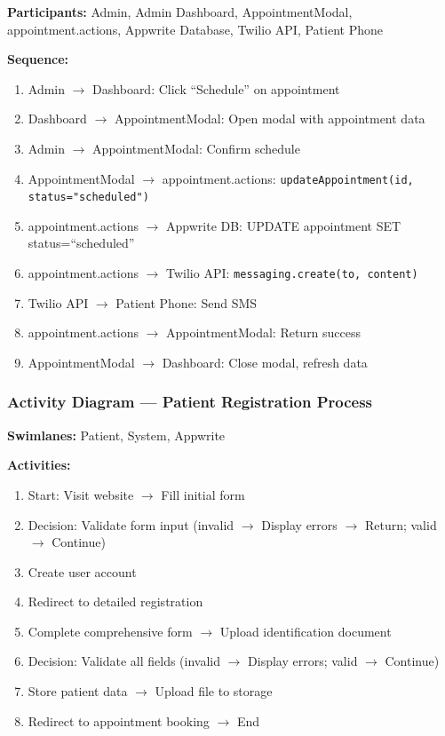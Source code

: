 \documentclass[11pt,a4paper]{article}
\begin{document}
\textbf{Participants:} Admin, Admin Dashboard, AppointmentModal, appointment.actions, Appwrite Database, Twilio API, Patient Phone

\textbf{Sequence:}
\begin{enumerate}
    \item Admin $\rightarrow$ Dashboard: Click ``Schedule'' on appointment
    \item Dashboard $\rightarrow$ AppointmentModal: Open modal with appointment data
    \item Admin $\rightarrow$ AppointmentModal: Confirm schedule
    \item AppointmentModal $\rightarrow$ appointment.actions: \texttt{updateAppointment(id, status="scheduled")}
    \item appointment.actions $\rightarrow$ Appwrite DB: UPDATE appointment SET status=``scheduled''
    \item appointment.actions $\rightarrow$ Twilio API: \texttt{messaging.create(to, content)}
    \item Twilio API $\rightarrow$ Patient Phone: Send SMS
    \item appointment.actions $\rightarrow$ AppointmentModal: Return success
    \item AppointmentModal $\rightarrow$ Dashboard: Close modal, refresh data
\end{enumerate}

\subsubsection{Activity Diagram --- Patient Registration Process}

\textbf{Swimlanes:} Patient, System, Appwrite

\textbf{Activities:}
\begin{enumerate}
    \item [Patient] Start: Visit website $\rightarrow$ Fill initial form
    \item [System] Decision: Validate form input (invalid $\rightarrow$ Display errors $\rightarrow$ Return; valid $\rightarrow$ Continue)
    \item [Appwrite] Create user account
    \item [System] Redirect to detailed registration
    \item [Patient] Complete comprehensive form $\rightarrow$ Upload identification document
    \item [System] Decision: Validate all fields (invalid $\rightarrow$ Display errors; valid $\rightarrow$ Continue)
    \item [Appwrite] Store patient data $\rightarrow$ Upload file to storage
    \item [System] Redirect to appointment booking $\rightarrow$ End
\end{enumerate}
\end{document}
